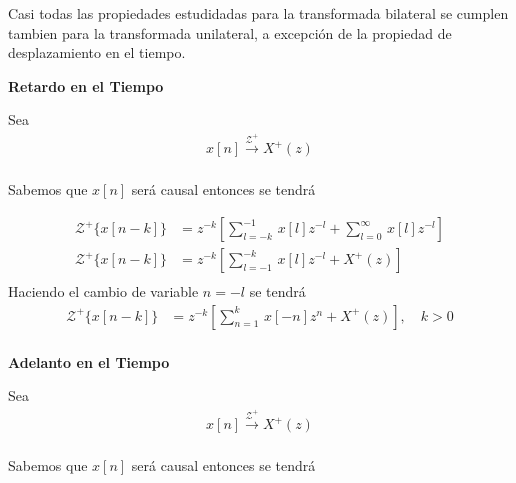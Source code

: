 \documentclass[12pt]{article}
\begin{document}
Casi todas las propiedades estudidadas para la transformada bilateral se cumplen tambien para la transformada unilateral, a excepción de la propiedad de desplazamiento en el tiempo.

\textbf{Retardo en el Tiempo}
\vspace{5mm}

Sea 
\begin{equation}
    \begin{split}
        x[n]\xrightarrow{\mathscr{Z}^+}X^+(z)\\
    \end{split}
    \label{eq:uzt_delay}
\end{equation}

Sabemos que $x[n]$ será causal entonces se tendrá

\begin{equation}
    \begin{split}
        \mathscr{Z}^+\{x[n-k]\}&=z^{-k}[\displaystyle\sum_{l=-k}^{-1}\,x[l]z^{-l}+\displaystyle\sum_{l=0}^{\infty}\,x[l]z^{-l}]\\
        \mathscr{Z}^+\{x[n-k]\}&=z^{-k}[\displaystyle\sum_{l=-1}^{-k}\,x[l]z^{-l}+X^+(z)]\\
    \end{split}
    \label{eq:uzt_delay1}
\end{equation}
Haciendo el cambio de variable $n=-l$ se tendrá
\begin{equation}
    \begin{split}
        \mathscr{Z}^+\{x[n-k]\}&=z^{-k}[\displaystyle\sum_{n=1}^{k}\,x[-n]z^{n}+X^+(z)], \quad k>0\\
    \end{split}
    \label{eq:uzt_delay2}
\end{equation}

\textbf{Adelanto en el Tiempo}
\vspace{5mm}

Sea 
\begin{equation}
    \begin{split}
        x[n]\xrightarrow{\mathscr{Z}^+}X^+(z)\\
    \end{split}
    \label{eq:uzt_advance}
\end{equation}

Sabemos que $x[n]$ será causal entonces se tendrá
\end{document}
